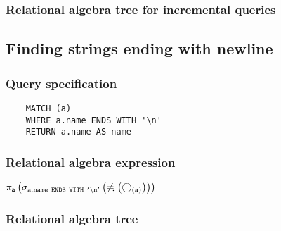 	\subsubsection*{Relational algebra tree for incremental queries}

	\subsection{Finding strings ending with newline}

	\subsubsection*{Query specification}

	\begin{lstlisting}
	MATCH (a)
	WHERE a.name ENDS WITH '\n'
	RETURN a.name AS name
	\end{lstlisting}


	\subsubsection*{Relational algebra expression}

	$\projection{\var{a}} \left(\selection{\mathtt{a.name~ENDS~WITH~'\backslash{}n'}} \left(\alldifferent{} \left(\getvertices{a}{}\right)\right)\right)$

	\subsubsection*{Relational algebra tree}


